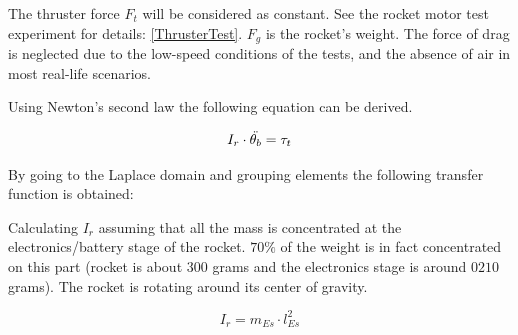		The thruster force $F_t$ will be considered as constant. See the rocket motor test experiment for details: \autoref{ThrusterTest}. $F_g$ is the rocket's weight. The force of drag is neglected due to the low-speed conditions of the tests, and the absence of air in most real-life scenarios.
		
		Using Newton's second law the following equation can be derived.

		\begin{equation}
			I_r \cdot \ddot{\theta_b}=\tau_t \addunit{\newton$\cdot$\meter} \label{eq:rocket_angle_1}
		\end{equation}
		\startexplain
		\stopexplain
		
%		
		
		By going to the Laplace domain and grouping elements the following transfer function is obtained:
%		
		
		Calculating $I_r$ assuming that all the mass is concentrated at the electronics/battery stage of the rocket. $70\%$ of the weight is in fact concentrated on this part (rocket is about $300$ grams and the electronics stage is around $0210$ grams). The rocket is rotating around its center of gravity.
		
		\begin{equation}
		I_r=m_{Es} \cdot l_{Es}^2 \label{eq:rocket_angle_3}
		\end{equation}
		\startexplain
		\stopexplain
		

